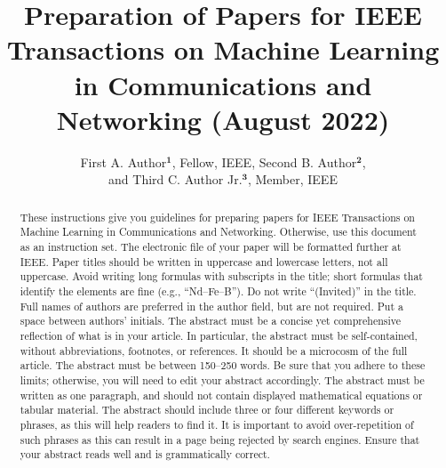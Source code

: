 \documentclass{ieeetmlcn}
\def\authorrefmark#1{\ensuremath{^{\textbf{#1}}}}
\begin{document}


\title{Preparation of Papers for IEEE Transactions on Machine Learning in Communications and Networking (August 2022)}

\author{First A. Author\authorrefmark{1}, Fellow, IEEE, Second B. Author\authorrefmark{2},\\ and Third C. Author Jr.\authorrefmark{3}, Member, IEEE}


\begin{abstract}
These instructions give you guidelines for preparing papers for IEEE Transactions on Machine Learning in Communications and Networking.
 Otherwise, use this document as an instruction set. The electronic file of your paper will be formatted further at IEEE. Paper titles should be written in uppercase and lowercase letters, not all uppercase. Avoid writing long formulas with subscripts in the title; short formulas that identify the elements are fine (e.g., ``Nd--Fe--B''). Do not write ``(Invited)'' in the title. Full names of authors are preferred in the author field, but are not required. Put a space between authors' initials. The abstract must be a concise yet comprehensive reflection of what is in your article. In particular, the abstract must be self-contained, without abbreviations, footnotes, or references. It should be a microcosm of the full article. The abstract must be between 150--250 words. Be sure that you adhere to these limits; otherwise, you will need to edit your abstract accordingly. The abstract must be written as one paragraph, and should not contain displayed mathematical equations or tabular material. The abstract should include three or four different keywords or phrases, as this will help readers to find it. It is important to avoid over-repetition of such phrases as this can result in a page being rejected by search engines. Ensure that your abstract reads well and is grammatically correct.
\end{abstract}
\end{document}
